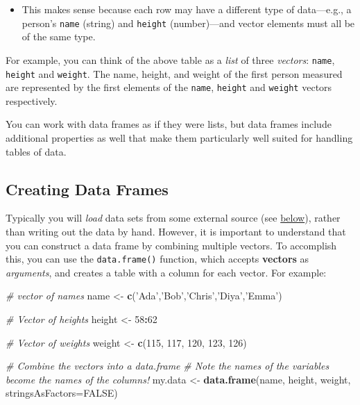 \documentclass[]{book}
\newenvironment{Shaded}{\begin{snugshade}}{\end{snugshade}}
\newcommand{\KeywordTok}[1]{\textcolor[rgb]{0.13,0.29,0.53}{\textbf{#1}}}
\newcommand{\DataTypeTok}[1]{\textcolor[rgb]{0.13,0.29,0.53}{#1}}
\newcommand{\DecValTok}[1]{\textcolor[rgb]{0.00,0.00,0.81}{#1}}
\newcommand{\StringTok}[1]{\textcolor[rgb]{0.31,0.60,0.02}{#1}}
\newcommand{\CommentTok}[1]{\textcolor[rgb]{0.56,0.35,0.01}{\textit{#1}}}
\newcommand{\OtherTok}[1]{\textcolor[rgb]{0.56,0.35,0.01}{#1}}
\newcommand{\OperatorTok}[1]{\textcolor[rgb]{0.81,0.36,0.00}{\textbf{#1}}}
\newcommand{\NormalTok}[1]{#1}
\providecommand{\tightlist}{%
  \setlength{\itemsep}{0pt}\setlength{\parskip}{0pt}}
\theoremstyle{definition}
\theoremstyle{definition}
\theoremstyle{remark}
\begin{document}
\begin{itemize}
\tightlist
\item
  This makes sense because each row may have a different type of
  data---e.g., a person's \texttt{name} (string) and \texttt{height}
  (number)---and vector elements must all be of the same type.
\end{itemize}

For example, you can think of the above table as a \emph{list} of three
\emph{vectors}: \texttt{name}, \texttt{height} and \texttt{weight}. The
name, height, and weight of the first person measured are represented by
the first elements of the \texttt{name}, \texttt{height} and
\texttt{weight} vectors respectively.

You can work with data frames as if they were lists, but data frames
include additional properties as well that make them particularly well
suited for handling tables of data.

\subsection{Creating Data Frames}\label{creating-data-frames}

Typically you will \emph{load} data sets from some external source (see
\protect\hyperlink{csv-files}{below}), rather than writing out the data
by hand. However, it is important to understand that you can construct a
data frame by combining multiple vectors. To accomplish this, you can
use the \texttt{data.frame()} function, which accepts \textbf{vectors}
as \emph{arguments}, and creates a table with a column for each vector.
For example:

\begin{Shaded}
\begin{Highlighting}[]
\CommentTok{# vector of names}
\NormalTok{name <-}\StringTok{ }\KeywordTok{c}\NormalTok{(}\StringTok{'Ada'}\NormalTok{,}\StringTok{'Bob'}\NormalTok{,}\StringTok{'Chris'}\NormalTok{,}\StringTok{'Diya'}\NormalTok{,}\StringTok{'Emma'}\NormalTok{)}

\CommentTok{# Vector of heights}
\NormalTok{height <-}\StringTok{ }\DecValTok{58}\OperatorTok{:}\DecValTok{62}

\CommentTok{# Vector of weights}
\NormalTok{weight <-}\StringTok{ }\KeywordTok{c}\NormalTok{(}\DecValTok{115}\NormalTok{, }\DecValTok{117}\NormalTok{, }\DecValTok{120}\NormalTok{, }\DecValTok{123}\NormalTok{, }\DecValTok{126}\NormalTok{)}

\CommentTok{# Combine the vectors into a data.frame}
\CommentTok{# Note the names of the variables become the names of the columns!}
\NormalTok{my.data <-}\StringTok{ }\KeywordTok{data.frame}\NormalTok{(name, height, weight, }\DataTypeTok{stringsAsFactors=}\OtherTok{FALSE}\NormalTok{)}
\end{Highlighting}
\end{Shaded}
\end{document}
